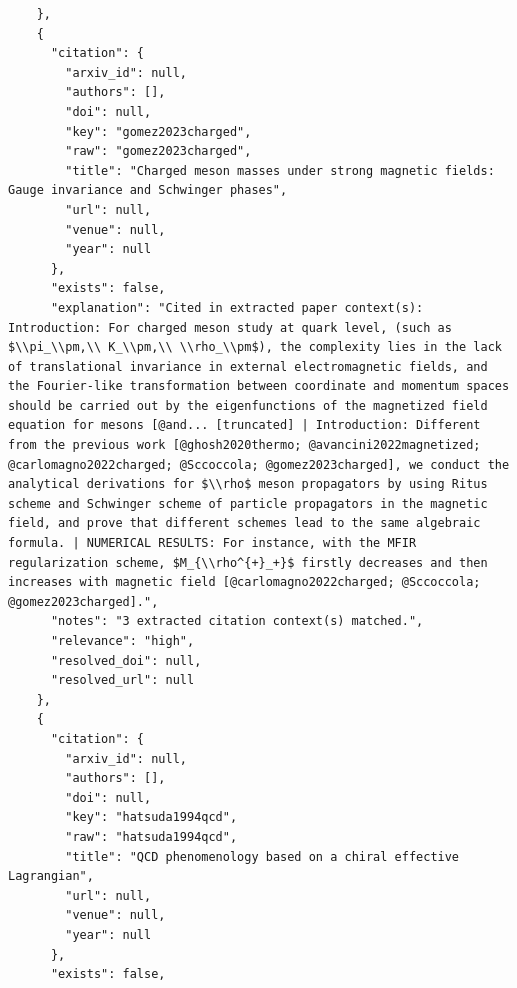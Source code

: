 \documentclass[11pt]{article}
\begin{document}
\begin{verbatim}
    },
    {
      "citation": {
        "arxiv_id": null,
        "authors": [],
        "doi": null,
        "key": "gomez2023charged",
        "raw": "gomez2023charged",
        "title": "Charged meson masses under strong magnetic fields: Gauge invariance and Schwinger phases",
        "url": null,
        "venue": null,
        "year": null
      },
      "exists": false,
      "explanation": "Cited in extracted paper context(s): Introduction: For charged meson study at quark level, (such as $\\pi_\\pm,\\ K_\\pm,\\ \\rho_\\pm$), the complexity lies in the lack of translational invariance in external electromagnetic fields, and the Fourier-like transformation between coordinate and momentum spaces should be carried out by the eigenfunctions of the magnetized field equation for mesons [@and... [truncated] | Introduction: Different from the previous work [@ghosh2020thermo; @avancini2022magnetized; @carlomagno2022charged; @Sccoccola; @gomez2023charged], we conduct the analytical derivations for $\\rho$ meson propagators by using Ritus scheme and Schwinger scheme of particle propagators in the magnetic field, and prove that different schemes lead to the same algebraic formula. | NUMERICAL RESULTS: For instance, with the MFIR regularization scheme, $M_{\\rho^{+}_+}$ firstly decreases and then increases with magnetic field [@carlomagno2022charged; @Sccoccola; @gomez2023charged].",
      "notes": "3 extracted citation context(s) matched.",
      "relevance": "high",
      "resolved_doi": null,
      "resolved_url": null
    },
    {
      "citation": {
        "arxiv_id": null,
        "authors": [],
        "doi": null,
        "key": "hatsuda1994qcd",
        "raw": "hatsuda1994qcd",
        "title": "QCD phenomenology based on a chiral effective Lagrangian",
        "url": null,
        "venue": null,
        "year": null
      },
      "exists": false,

\end{verbatim}
\end{document}

